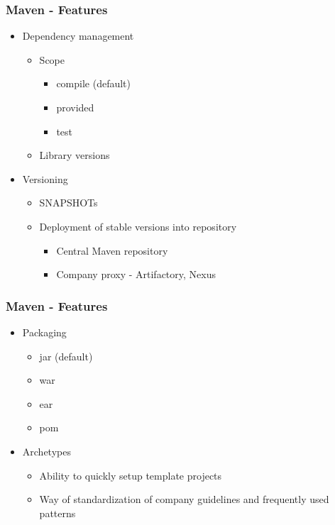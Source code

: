 \begin{frame}
\frametitle{Maven - Features}
\begin{itemize}
	\item Dependency management
		\begin{itemize}
		\item Scope
			\begin{itemize}
			\item compile (default)
			\item provided
			\item test
			\end{itemize}
		\item Library versions
		\end{itemize}
	\item Versioning
		\begin{itemize}
		\item SNAPSHOTs
		\item Deployment of stable versions into repository
			\begin{itemize}
			\item Central Maven repository
			\item Company proxy - Artifactory, Nexus
			\end{itemize}
		\end{itemize}		
\end{itemize}
\end{frame}

\begin{frame}
\frametitle{Maven - Features}
\begin{itemize}
	\item Packaging
		\begin{itemize}
		\item jar (default)
		\item war
		\item ear
   		\item pom
		\end{itemize}
	\item Archetypes
		\begin{itemize}
		\item Ability to quickly setup template projects
		\item Way of standardization of company guidelines and frequently used patterns
		\end{itemize}			
\end{itemize}
\end{frame}

